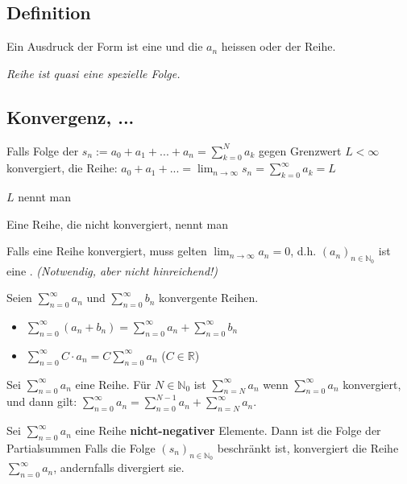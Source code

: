\subsection{Definition}

Ein Ausdruck der Form  ist eine  und die $a_n$ heissen  oder  der Reihe.

\textit{Reihe ist quasi eine spezielle Folge.}

\subsection{Konvergenz, ...}

Falls Folge der  $s_n:=a_0+a_1 + ... + a_n = \sum_{k=0}^{N}a_k$ gegen Grenzwert $L < \infty$ konvergiert,  die Reihe: $a_0 + a_1 + ... = \lim_{n \rightarrow \infty} s_n = \sum_{k=0}^{\infty} a_k = L$

$L$ nennt man 

Eine Reihe, die nicht konvergiert, nennt man 

 Falls eine Reihe konvergiert, muss gelten $\lim_{n \rightarrow \infty} a_n = 0$, d.h. $(a_n)_{n \in \mathbb{N}_0}$ ist eine . \textit{(Notwendig, aber nicht hinreichend!)}



Seien $\sum_{n=0}^{\infty} a_n$ und $\sum_{n=0}^{\infty}b_n$ konvergente Reihen.\\ 

\begin{itemize}
    \item $\sum_{n=0}^{\infty} (a_n + b_n) = \sum_{n=0}^{\infty} a_n +  \sum_{n=0}^{\infty} b_n$
    \item $\sum_{n=0}^{\infty} C \cdot a_n = C \sum_{n=0}^{\infty} a_n$ ($C \in \mathbb{R}$)
\end{itemize}

Sei $\sum_{n=0}^{\infty} a_n$ eine Reihe. Für $N \in \mathbb{N}_0$ ist $\sum_{n=N}^{\infty} a_n$  wenn $\sum_{n=0}^{\infty} a_n$ konvergiert, und dann gilt: $\sum_{n=0}^{\infty} a_n = \sum_{n=0}^{N -1} a_n + \sum_{n=N}^{\infty} a_n$.

Sei $\sum_{n=0}^{\infty} a_n$ eine Reihe \textbf{nicht-negativer} Elemente. 
Dann ist die Folge der Partialsummen 
Falls die Folge $(s_n)_{n\in\mathbb{N}_0}$ beschränkt ist, konvergiert die Reihe $\sum_{n=0}^{\infty} a_n$, andernfalls divergiert sie.

